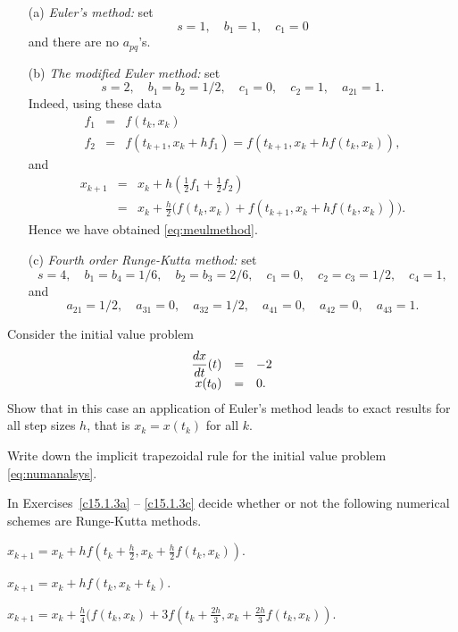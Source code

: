 \documentclass{ximera}
\begin{document}
\begin{itemize}
\item[(a)] {\em Euler's method:} 
set
\[
s=1,\quad b_1=1,\quad c_1=0 
\]
and there are no $a_{pq}$'s.
\item[(b)] {\em The modified Euler method:} 
 set
\[
s=2,\quad b_1=b_2=1/2,\quad c_1=0,\quad c_2=1,\quad a_{21}=1.
\]
Indeed, using these data
\begin{eqnarray*}
f_1 &=& f(t_k,x_k)\\
f_2 &=& f(t_{k+1},x_k+hf_1)=f(t_{k+1},x_k+hf(t_k,x_k)),
\end{eqnarray*}
and
\begin{eqnarray*}
x_{k+1} &=& x_k + h \left(\frac{1}{2}f_1 + \frac{1}{2}f_2\right)\\
&=& x_k + \frac{h}{2}
\Big( f(t_k, x_k)+f(t_{k+1}, x_k + h f(t_k, x_k))\Big).
\end{eqnarray*}
Hence we have obtained \eqref{eq:meulmethod}.
\item[(c)] {\em Fourth order Runge-Kutta method:} 
set 
\[
s=4,\quad b_1=b_4=1/6,\quad b_2=b_3=2/6,\quad 
c_1=0,\quad c_2=c_3=1/2,\quad c_4=1,
\]
and 
\[
a_{21}=1/2,\quad a_{31}=0,\quad a_{32}=1/2,\quad
a_{41}=0,\quad a_{42}=0,\quad a_{43}=1.
\]
\end{itemize}


\EXER

\TEXER

\begin{exercise} \label{c15.1.1}
Consider the initial value problem
\[
\begin{array}{rcl}
\displaystyle\frac{dx}{dt}(t) & = & -2 \\
x(t_0) & = & 0.
\end{array}
\]
Show that in this case an application of Euler's method 
leads to exact results for all step sizes $h$,
that is $x_k=x(t_k)$ for all $k$.
\end{exercise}

\begin{exercise} \label{c15.1.2}
Write down the implicit trapezoidal rule for the initial
value problem \eqref{eq:numanalsys}.
\end{exercise}

\noindent In Exercises~\ref{c15.1.3a} -- \ref{c15.1.3c}
decide whether or not the following numerical schemes are Runge-Kutta methods.
\begin{exercise} \label{c15.1.3a}
$x_{k+1} = x_k + hf(t_k+\frac{h}{2},x_k+\frac{h}{2}f(t_k,x_k))$.
\end{exercise}
\begin{exercise} \label{c15.1.3b}
$x_{k+1} = x_k + hf(t_k,x_k+t_k)$.
\end{exercise}
\begin{exercise} \label{c15.1.3c}
$x_{k+1} = x_k + 
\frac{h}{4}(f(t_k,x_k)+3f(t_k+\frac{2h}{3},x_k+\frac{2h}{3}f(t_k,x_k))$.
\end{exercise}
\end{document}
